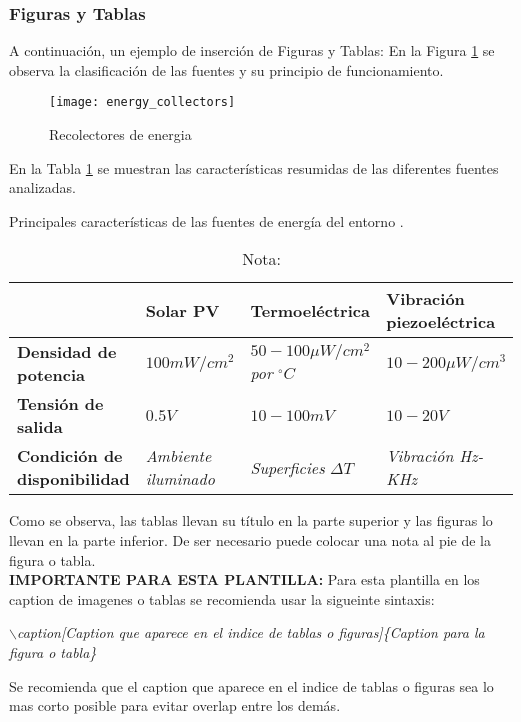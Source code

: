 \subsubsection{Figuras y Tablas}
A continuación, un ejemplo de inserción de Figuras y Tablas:
En la Figura \ref{Fig: colectores de energia} se observa la clasificación de las fuentes y su principio de funcionamiento.
\begin{figure}[H]
	\centering
	\texttt{[image: energy\_collectors]}
	\caption{Recolectores de energia}
	\label{Fig: colectores de energia}
\end{figure}
En la Tabla \ref{Tab: fuentes de energia} se muestran las características resumidas de las diferentes fuentes analizadas.
\begin{table}[H]
	\centering
	\caption[Características de las fuentes de energía del entorno \cite{Rodriguez}.]{Principales características de las fuentes de energía del entorno \cite{Rodriguez}.}
	\label{Tab: fuentes de energia}
	\begin{tabular}{m{2.9cm}m{2.5cm}m{4.5cm}m{3.3cm}}
		\hline
		& \textbf{Solar PV} & \textbf{Termoeléctrica} &\textbf{Vibración piezoeléctrica} \\
		\hline
		\textbf{Densidad de potencia} & $100mW/cm^2$ & $50-100\mu W/cm^2$ \textit{por} $^{\circ} C$ & $10-200\mu W/cm^3$  \\
		\textbf{Tensión de salida} & $0.5V$ & $10-100mV$ & $10-20V$ \\
		\textbf{Condición de disponibilidad} & \textit{Ambiente iluminado} & \textit{Superficies} $\Delta T$ & \textit{Vibración Hz-KHz} \\
		\hline
	\end{tabular}
	\caption*{Nota:}
\end{table}
Como se observa, las tablas llevan su título en la parte superior y las figuras lo llevan en la parte inferior. De ser necesario puede colocar una nota al pie de la figura o tabla.\\

\textbf{IMPORTANTE PARA ESTA PLANTILLA:} Para esta plantilla en los caption de imagenes o tablas se recomienda usar la sigueinte sintaxis:
\begin{center}
	\small{\footnotesize }{\textit{$\backslash$caption[Caption que aparece en el indice de tablas o figuras]\{Caption para la figura o tabla\}}}
\end{center}
Se recomienda que el caption que aparece en el indice de tablas o figuras sea lo mas corto posible para evitar overlap entre los demás.
\newpage